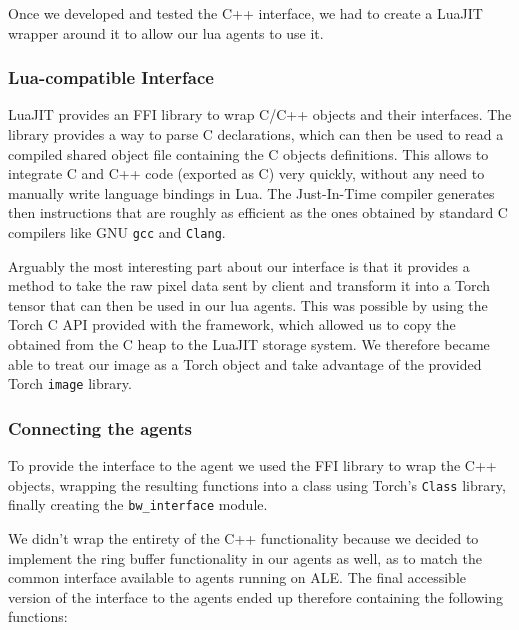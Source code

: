 Once we developed and tested the C++ interface, we had to create a LuaJIT
wrapper around it to allow our lua agents to use it.

\subsubsection{Lua-compatible Interface}

LuaJIT provides an FFI library to wrap C/C++ objects and their interfaces. The
library provides a way to parse C declarations, which can then be used to read a
compiled shared object file containing the C objects definitions. This allows to
integrate C and C++ code (exported as C) very quickly, without any need to
manually write language bindings in Lua. The Just-In-Time compiler generates
then instructions that are roughly as efficient as the ones obtained by standard
C compilers like GNU \texttt{gcc} and \texttt{Clang}.

Arguably the most interesting part about our interface is that it provides a
method to take the raw pixel data sent by client and transform it into a Torch
tensor that can then be used in our lua agents. This was possible by using the
Torch C API provided with the framework, which allowed us to copy the obtained
from the C heap to the LuaJIT storage system. We therefore became able to treat
our image as a Torch object and take advantage of the provided Torch
\texttt{image} library.

\subsubsection{Connecting the agents}

To provide the interface to the agent we used the FFI library to wrap the C++
objects, wrapping the resulting functions into a class using Torch's
\texttt{Class} library, finally creating the \texttt{bw\_interface} module.

We didn't wrap the entirety of the C++ functionality because we decided to
implement the ring buffer functionality in our agents as well, as to match the
common interface available to agents running on ALE. The final accessible
version of the interface to the agents ended up therefore containing the
following functions:


